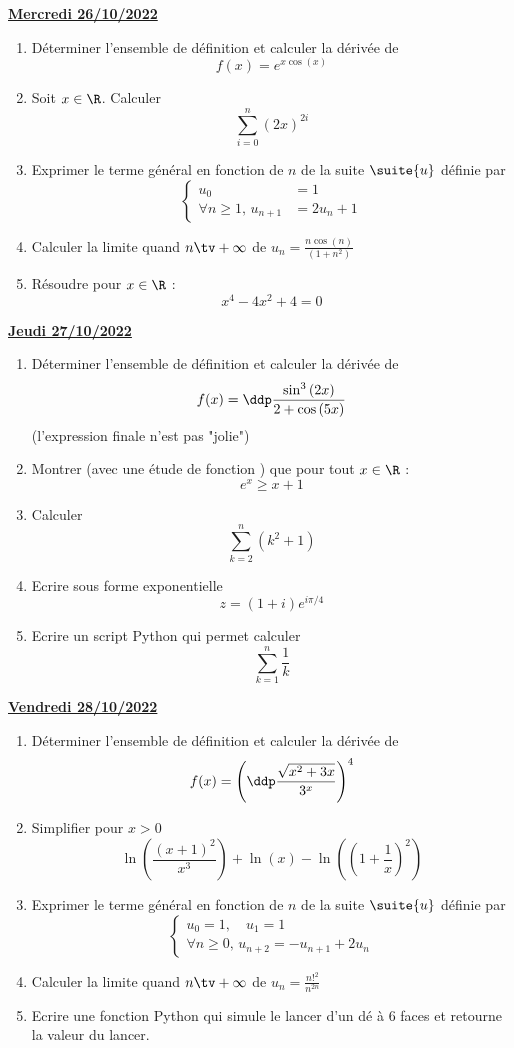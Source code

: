 \documentclass[a4paper, 11pt,reqno]{article}
\newcommand{\jour}[1]{
\begin{center}
\underline{\textbf{#1}}
\end{center}

 }
\begin{document}
\jour{Mercredi 26/10/2022}
\begin{exercice}
\begin{enumerate}
\item  Déterminer l'ensemble de définition et calculer la dérivée de
$$f(x)=e^{x\cos{(x)}}$$
\item Soit $x\in\R$. Calculer $$\sum_{i=0}^n (2x)^{2i}$$ 
\item Exprimer le terme général en fonction de $n$ de la suite $\suite{u}$ définie par 
$$\left\{\begin{array}{rl}
u_0 &=1\\
\forall n\geq 1,\,  u_{n+1}&= 2u_n +1
\end{array}\right.$$
\item Calculer la limite quand $n\tv+\infty$ de $u_n=\frac{n\cos(n)}{(1+n^2)}$
\item Résoudre pour $x\in \R$ :
$$x^4-4x^2+4=0$$
\end{enumerate}
\end{exercice}

\jour{Jeudi 27/10/2022}
\begin{exercice}
\begin{enumerate}
\item  Déterminer l'ensemble de définition et calculer la dérivée de
 $$f(x)=\ddp\frac{\sin^3{(2x)}}{2+\cos{(5x)}}$$
 (l'expression finale n'est pas "jolie")
\item  Montrer (avec une étude de fonction ) que pour tout $x\in \R$ :
$$e^x\geq x+1$$
\item  Calculer 
$$\sum_{k=2}^{n} (k^2+1)$$
\item Ecrire sous forme exponentielle $$z=(1+i)e^{i\pi /4}$$
\item Ecrire un script Python qui permet calculer 
$$\sum_{k=1}^n \frac{1}{k}$$
\end{enumerate}
\end{exercice}



\jour{Vendredi 28/10/2022}
\begin{exercice}
\begin{enumerate}
\item  Déterminer l'ensemble de définition et calculer la dérivée de
$$f(x)=\left(  \ddp\frac{\sqrt{x^2+3x}}{3^x} \right)^4$$
\item Simplifier pour $x>0$ 
$$\ln\left(\frac{(x+1)^2}{x^3}\right) +\ln(x)-\ln\left(\left(1+\frac{1}{x}\right)^2\right)$$
\item Exprimer le terme général en fonction de $n$ de la suite $\suite{u}$ définie par 
$$\left\{\begin{array}{l}
u_0 =1,\quad u_1=1\\
\forall n\geq 0,\,  u_{n+2}= -u_{n+1} +2u_n
\end{array}\right.$$
\item Calculer la limite quand $n\tv+\infty$ de $u_n=\frac{n!^2}{n^{2n}}$
\item Ecrire une fonction Python qui simule le lancer d'un dé à 6 faces et retourne la valeur du lancer. 
\end{enumerate}
\end{exercice}
\end{document}
